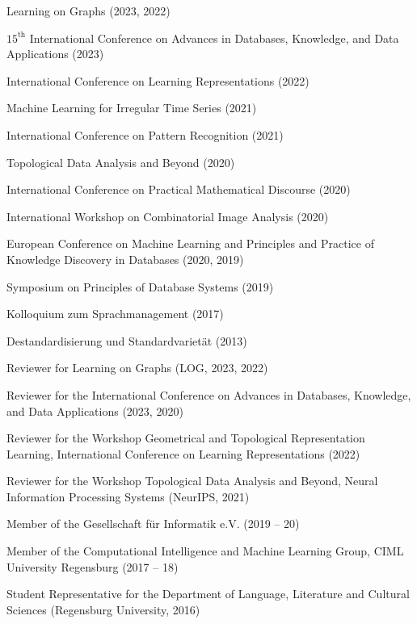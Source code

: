 \documentclass[a4paper, 12pt]{article}
\newcommand{\years}[1]{\marginnote{\scriptsize #1}}
\begin{document}
	\years{Conferences}
	\vspace{-10pt}
	\begin{etaremune}[itemsep=-5pt, leftmargin=15pt]
		\item Learning on Graphs (2023, 2022)
		\item $15^{\text{th}}$ International Conference on Advances in Databases, Knowledge, and Data Applications (2023)
		\item International Conference on Learning Representations (2022)
		\item Machine Learning for Irregular Time Series (2021)
		\item International Conference on Pattern Recognition (2021)
		\item Topological Data Analysis and Beyond (2020)
		\item International Conference on Practical Mathematical Discourse (2020)
		\item International Workshop on Combinatorial Image Analysis (2020)
		\item European Conference on Machine Learning and Principles and Practice of Knowledge Discovery in Databases (2020, 2019)
		\item Symposium on Principles of Database Systems (2019)
		\item Kolloquium zum Sprachmanagement (2017)
		\item Destandardisierung und Standardvarietät (2013)
	\end{etaremune}
	\vspace{10pt}

	\years{Service}
	\vspace{-10pt}
	\begin{etaremune}[itemsep=-5pt, leftmargin=15pt]
		\item Reviewer for Learning on Graphs (LOG, 2023, 2022)
		\item Reviewer for the International Conference on Advances in Databases, Knowledge, and Data Applications (2023, 2020)
		\item Reviewer for the Workshop Geometrical and Topological Representation Learning, International Conference on Learning Representations (2022)
		\item Reviewer for the Workshop Topological Data Analysis and Beyond, Neural Information Processing Systems (NeurIPS, 2021)
		\item Member of the Gesellschaft für Informatik e.V. (2019 -- 20)
		\item Member of the Computational Intelligence and Machine Learning Group, CIML University Regensburg (2017 -- 18)
		\item Student Representative for the Department of Language, Literature and Cultural Sciences (Regensburg University, 2016)
	\end{etaremune}
	\vspace{10pt}
\end{document}
